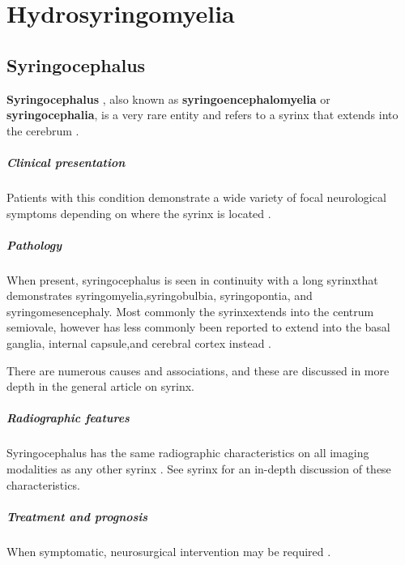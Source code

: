 \chapter{Hydrosyringomyelia}

\section{Syringocephalus}

\textbf{Syringocephalus} , also known as \textbf{syringoencephalomyelia} or \textbf{syringocephalia}, is a very rare entity and refers to a syrinx that extends into the cerebrum .

\paragraph{Clinical presentation}

Patients with this condition demonstrate a wide variety of focal neurological symptoms depending on where the syrinx is located .


\paragraph{Pathology}

When present, syringocephalus is seen in continuity with a long syrinxthat demonstrates syringomyelia,syringobulbia, syringopontia, and syringomesencephaly. Most commonly the syrinxextends into the centrum semiovale, however has less commonly been reported to extend into the basal ganglia, internal capsule,and cerebral cortex instead .

There are numerous causes and associations, and these are discussed in more depth in the general article on syrinx.


\paragraph{Radiographic features}

Syringocephalus has the same radiographic characteristics on all imaging modalities as any other syrinx . See syrinx for an in-depth discussion of these characteristics.


\paragraph{Treatment and prognosis}

When symptomatic, neurosurgical intervention may be required .

